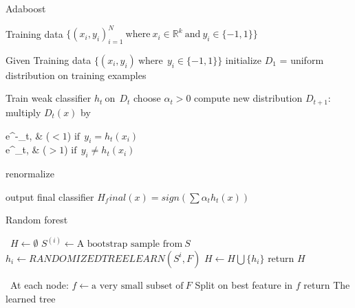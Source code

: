 \documentclass[a4paper]{article}
\begin{document}
  \begin{algorithm}
   \caption{Adaboost ~\cite{adaboostsecond}}
    \begin{algorithmic}[1]
    \INPUT 
    \Statex Training data $\{(x_i,y_i)_{i=1}^N \ \text{where}\ x_i \in  \mathbb{R}^k \ \text{and} \  y_i \in \{-1,1\} \}$
   
    \State Given Training data $\{(x_i,y_i) \ \text{where}\  \  y_i \in \{-1,1\} \}$
    \State initialize $D_1$ = uniform distribution on training examples
   
            \State Train weak classifier $h_t \  \text{on}\   \   D_t $
            \State choose $\alpha_t > 0 $
            \State compute new distribution $D_{t+1}$:
              \State multiply $D_t(x)$ by \begin{numcases}{}
  e^{-\alpha_t}, &  ($<1$) $ \text{if}\  \  y_i = h_t(x_i) $\\
   e^{\alpha_t}, & ($>1$) $ \text{if}\  \  y_i \neq h_t(x_i) $
\end{numcases}
\State renormalize
         \EndFor 
         
  \State output final classifier $H_final(x) = sign (\sum\alpha_t h_t(x))$
            
        
        
         
        
        \EndFor
        
       


\end{algorithmic}
\end{algorithm}

  


  \begin{algorithm}
   \caption{Random forest ~\cite{randomforest1}}
    \begin{algorithmic}[1]
      \
      \State $H \leftarrow  \emptyset $
            \State $S^{(i)}\leftarrow \text{A bootstrap sample from} \  S $
            \State $h_i \leftarrow RANDOMIZEDTREELEARN(S^{i},F)$
            \State $H \leftarrow H \bigcup \{h_i\}$
        \EndFor
        \State return $H$
        
        
         



 \EndFunction

  \ 
  \State At each node:
  \State $f \leftarrow \text{a very small subset of} \ F $
  \State Split on best feature in $f$
  \State return The learned tree
   \EndFunction

\end{algorithmic}
\end{algorithm}
\end{document}
